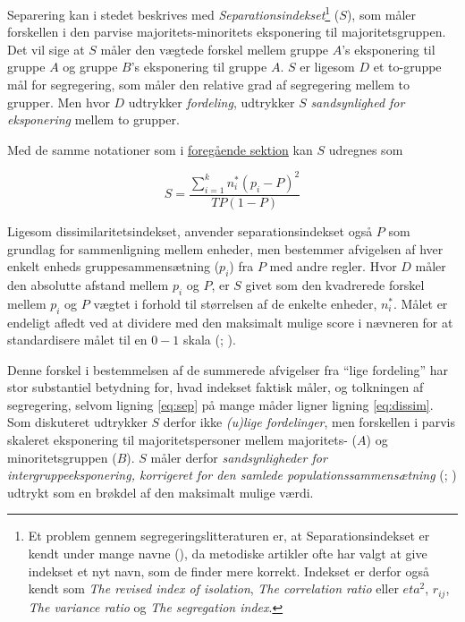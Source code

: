 \documentclass[
]{book}
\begin{document}
Separering kan i stedet beskrives med \emph{Separationsindekset}\footnote{Et problem gennem segregeringslitteraturen er, at Separationsindekset er kendt under mange navne (), da metodiske artikler ofte har valgt at give indekset et nyt navn, som de finder mere korrekt. Indekset er derfor også kendt som \emph{The revised index of isolation}, \emph{The correlation ratio} eller \(eta^{2}\), \(r_{ij}\), \emph{The variance ratio} og \emph{The segregation index}.} (\(S\)), som måler forskellen i den parvise majoritets-minoritets eksponering til majoritetsgruppen. Det vil sige at \(S\) måler den vægtede forskel mellem gruppe \(A\)'s eksponering til gruppe \(A\) og gruppe \(B\)'s eksponering til gruppe \(A\). \(S\) er ligesom \(D\) et to-gruppe mål for segregering, som måler den relative grad af segregering mellem to grupper. Men hvor \(D\) udtrykker \emph{fordeling}, udtrykker \(S\) \emph{sandsynlighed for eksponering} mellem to grupper.

Med de samme notationer som i \hyperref[dissimkap]{foregående sektion} kan \(S\) udregnes som

\begin{equation}
\label{eq:sep}
S = \frac{{\textstyle \sum_{i=1}^{k}} n_{i}^{*} \left ( p_{i}-P \right )^{2} }{ TP \left ( 1-P \right ) } 
\end{equation}

Ligesom dissimilaritetsindekset, anvender separationsindekset også \(P\) som grundlag for sammenligning mellem enheder, men bestemmer afvigelsen af hver enkelt enheds gruppesammensætning (\(p_{i}\)) fra \(P\) med andre regler. Hvor \(D\) måler den absolutte afstand mellem \(p_{i}\) og \(P\), er \(S\) givet som den kvadrerede forskel mellem \(p_{i}\) og \(P\) vægtet i forhold til størrelsen af de enkelte enheder, \(n_{i}^{*}\). Målet er endeligt afledt ved at dividere med den maksimalt mulige score i nævneren for at standardisere målet til en \(0-1\) skala (; ).

Denne forskel i bestemmelsen af de summerede afvigelser fra ``lige fordeling'' har stor substantiel betydning for, hvad indekset faktisk måler, og tolkningen af segregering, selvom ligning \eqref{eq:sep} på mange måder ligner ligning \eqref{eq:dissim}. Som diskuteret udtrykker \(S\) derfor ikke \emph{(u)lige fordelinger}, men forskellen i parvis skaleret eksponering til majoritetspersoner mellem majoritets- (\(A\)) og minoritetsgruppen (\(B\)). \(S\) måler derfor \emph{sandsynligheder for intergruppeeksponering, korrigeret for den samlede populationssammensætning} (; ) udtrykt som en brøkdel af den maksimalt mulige værdi.
\end{document}
